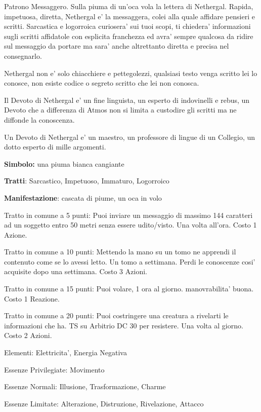 \documentclass[a4paper,11pt,twoside,openany]{dndbook}
\begin{document}
{\label{nethergal}

Patrono Messaggero. Sulla piuma di un'oca vola la lettera di Nethergal. Rapida, impetuosa, diretta, Nethergal e' la messaggera, colei alla quale affidare pensieri e scritti. Sarcastica e logorroica curiosera' sui tuoi scopi, ti chiedera' informazioni sugli scritti affidatole con esplicita franchezza ed avra' sempre qualcosa da ridire sul messaggio da portare ma sara' anche altrettanto diretta e precisa nel consegnarlo. 

Nethergal non e' solo chiacchiere e pettegolezzi, qualsiasi testo venga scritto lei lo conosce, non esiste codice o segreto scritto che lei non conosca.

Il Devoto di Nethergal e' un fine linguista, un esperto di indovinelli e rebus, un Devoto che a differenza di Atmos non si limita a custodire gli scritti ma ne diffonde la conoscenza.

Un Devoto di Nethergal e' un maestro, un professore di lingue di un Collegio, un dotto esperto di mille argomenti.

\textbf{Simbolo:} una piuma bianca cangiante

\textbf{Tratti}: Sarcastico, Impetuoso, Immaturo, Logorroico

\textbf{Manifestazione}: cascata di piume, un oca in volo

\bigskip

Tratto in comune a 5 punti: Puoi inviare un messaggio di massimo 144 caratteri ad un soggetto entro 50 metri senza essere udito/visto. Una volta all'ora. Costo 1 Azione.

Tratto in comune a 10 punti: Mettendo la mano su un tomo ne apprendi il contenuto come se lo avessi letto. Un tomo a settimana. Perdi le conoscenze cosi' acquisite dopo una settimana. Costo 3 Azioni.

Tratto in comune a 15 punti: Puoi volare, 1 ora al giorno. manovrabilita' buona. Costo 1 Reazione.

Tratto in comune a 20 punti: Puoi costringere una creatura a rivelarti le informazioni che ha. TS su Arbitrio DC 30 per resistere. Una volta al giorno. Costo 2 Azioni.

\bigskip

Elementi: Elettricita', Energia Negativa

\bigskip

Essenze Privilegiate: Movimento

Essenze Normali: Illusione, Trasformazione, Charme

Essenze Limitate: Alterazione, Distruzione, Rivelazione, Attacco

}
\end{document}

